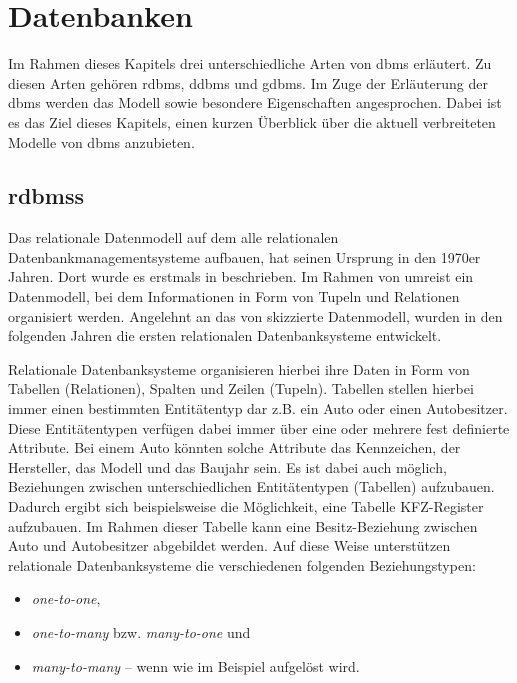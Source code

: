 \chapter{Datenbanken}
Im Rahmen dieses Kapitels drei unterschiedliche Arten von \acl{dbms} erläutert. Zu diesen Arten gehören \acl{rdbms}, \acl{ddbms} und \acl{gdbms}. Im Zuge der Erläuterung der \acs{dbms} werden das Modell sowie besondere Eigenschaften angesprochen. Dabei ist es das Ziel dieses Kapitels, einen kurzen Überblick über die aktuell verbreiteten Modelle von \acl{dbms} anzubieten. 

\section{\acl{rdbms}s}
Das relationale Datenmodell auf dem alle relationalen Datenbankmanagementsysteme aufbauen, hat seinen Ursprung in den 1970er Jahren. Dort wurde es erstmals in \cite{codd_relational_model} beschrieben. Im Rahmen von \cite{codd_relational_model} umreist \citeauthor{codd_relational_model} ein Datenmodell, bei dem Informationen in Form von Tupeln und Relationen organisiert werden. Angelehnt an das von \citeauthor{codd_relational_model} skizzierte Datenmodell, wurden in den folgenden Jahren die ersten relationalen Datenbanksysteme entwickelt. 

Relationale Datenbanksysteme organisieren hierbei ihre Daten in Form von Tabellen (Relationen), Spalten und Zeilen (Tupeln). Tabellen stellen hierbei immer einen bestimmten Entitätentyp dar z.B. ein Auto oder einen Autobesitzer. Diese Entitätentypen verfügen dabei immer über eine oder mehrere fest definierte Attribute. Bei einem Auto könnten solche Attribute das Kennzeichen, der Hersteller, das Modell und das Baujahr sein. Es ist dabei auch möglich, Beziehungen zwischen unterschiedlichen Entitätentypen (Tabellen) aufzubauen. Dadurch ergibt sich beispielsweise die Möglichkeit, eine Tabelle KFZ-Register aufzubauen. Im Rahmen dieser Tabelle kann eine Besitz-Beziehung zwischen Auto und Autobesitzer abgebildet werden. Auf diese Weise unterstützen relationale Datenbanksysteme die verschiedenen folgenden Beziehungstypen: 
\begin{itemize}
    \item \textit{one-to-one}, 
    \item \textit{one-to-many} bzw. \textit{many-to-one} und 
    \item \textit{many-to-many} -- wenn wie im Beispiel aufgelöst wird. 
\end{itemize}

